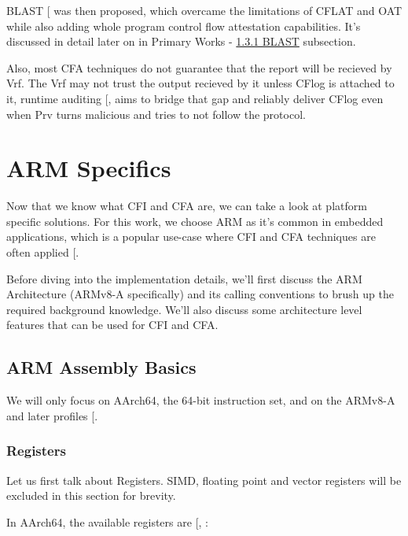 \documentclass[a4paper, nobind]{templates/ociamthesis}
\begin{document}
BLAST {[}\citeproc{ref-blast}{55}{]} was then proposed, which overcame the limitations of CFLAT and OAT while
also adding whole program control flow attestation capabilities. It's discussed
in detail later on in Primary Works - \hyperref[blast]{1.3.1 BLAST} subsection.

Also, most CFA techniques do not guarantee that the report will be recieved by Vrf.
The Vrf may not trust the output recieved by it unless CFlog is attached to it,
runtime auditing {[}, \citeproc{ref-caulfield2023acfa}{20}{]} aims to bridge that
gap and reliably deliver CFlog even when Prv turns malicious and tries to not
follow the protocol.

\section{ARM Specifics}\label{arm-specifics}

Now that we know what CFI and CFA are, we can take a look at platform specific solutions.
For this work, we choose ARM as it's common in embedded applications,
which is a popular use-case where CFI and CFA techniques are often applied {[}\citeproc{ref-sok}{5}{]}.

Before diving into the implementation details, we'll first discuss the ARM Architecture
(ARMv8-A specifically) and its calling conventions to brush up the required background knowledge.
We'll also discuss some architecture level features that can be used for CFI and CFA.

\subsection{ARM Assembly Basics}\label{arm-assembly-basics}

We will only focus on AArch64, the 64-bit instruction set, and on the ARMv8-A
and later profiles {[}\citeproc{ref-arm-arch-manual}{11}{]}.

\subsubsection{Registers}\label{registers}

Let us first talk about Registers.
SIMD, floating point and vector registers will be excluded in this section for brevity.

In AArch64, the available registers are {[}, \citeproc{ref-arm-isa}{10}{]}:
\end{document}
